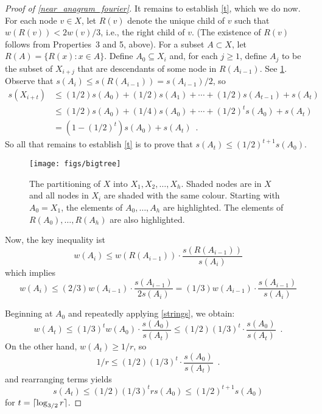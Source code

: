 \documentclass{patmorin}
\begin{document}
\begin{proof}[Proof of \cref{near_anagram_fourier}]
  It remains to establish \cref{t}, which we do now.  For each node
  $v\in X$, let $R(v)$ denote the unique child of $v$ such that $w(R(v))
  < 2w(v)/3$, i.e., the right child of $v$. (The existence of $R(v)$ follows from Properties~3 and
  5, above).  For a subset $A\subset X$, let $R(A)=\{R(x):x\in A\}$.
  Define $A_0\subseteq X_i$ and, for each $j\ge 1$, define $A_j$
  to be the subset of $X_{i+j}$ that are descendants of some node in
  $R(A_{i-1})$.  See \cref{bigtree}. Observe that $s(A_i) \le s(R(A_{i-1})) = s(A_{i-1})/2$,
  so
   \begin{align*}
      s(X_{i+t})
         &\le (1/2)s(A_0) + (1/2)s(A_1) + \cdots + (1/2)s(A_{t-1}) + s(A_t) \\
         &\le (1/2)s(A_0) + (1/4)s(A_0) + \cdots + (1/2)^t s(A_{0}) + s(A_t) \\
         &  = (1-(1/2)^t)s(A_0) + s(A_t) \enspace .
   \end{align*}
  So all that remains to establish \eqref{t} is to prove that
  $s(A_t)\le (1/2)^{t+1}s(A_0)$.

  \begin{figure}
    \begin{center}
       \texttt{[image: figs/bigtree]}
    \end{center}
    \caption{The partitioning of $X$ into $X_1,X_2,\ldots,X_h$. Shaded
    nodes are in $X$ and all nodes in $X_i$ are shaded with the same
    colour.   Starting with $A_0=X_1$, the elements of $A_0,\ldots,A_h$
    are highlighted.  The elements of $R(A_0),\ldots,R(A_h)$ are also highlighted.}
    \label{bigtree}
  \end{figure}

  Now, the key inequality is{t}
  \begin{equation}
      w(A_i) \le w(R(A_{i-1}))\cdot\frac{s(R(A_{i-1}))}{s(A_i)}
  \end{equation}
  which implies
  \begin{equation}
       w(A_i) \le (2/3)w(A_{i-1})\cdot\frac{s(A_{i-1})}{2s(A_i)}
             = (1/3)w(A_{i-1})\cdot\frac{s(A_{i-1})}{s(A_i)}
             \label{strings}
  \end{equation}

  Beginning at $A_0$ and repeatedly applying \cref{strings}, we obtain:
  \[
      w(A_t) \le (1/3)^t w(A_0)\cdot\frac{s(A_0)}{s(A_t)}
             \le (1/2)(1/3)^t \cdot\frac{s(A_0)}{s(A_t)} \enspace .
  \]
  On the other hand, $w(A_t)\ge 1/r$, so
  \[
      1/r \le (1/2)(1/3)^t\cdot\frac{s(A_0)}{s(A_t)} \enspace .
  \]
  and rearranging terms yields
  \[
     s(A_t) \le (1/2)(1/3)^t r s(A_0) \le (1/2)^{t+1}s(A_0)
  \]
  for $t = {\lceil \log_{3/2} r \rceil}$.
\end{proof}
\end{document}

